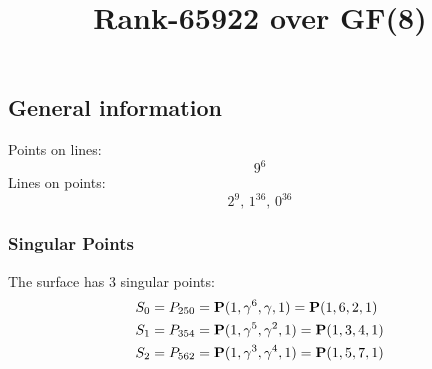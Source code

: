 \documentclass{article}
\newcommand\setTBstruts{\def\T{\rule{0pt}{2.6ex}}%
\def\B{\rule[-1.2ex]{0pt}{0pt}}}
\newcommand{\bP}{{\bf P}}
\begin{document}
 
\setTBstruts



{\allowdisplaybreaks%






\title{Rank-65922 over GF(8)}
\author{}%
\maketitle%
%
{}



\subsection*{General information}
Points on lines:
$$
9^6$$
Lines on points:
$$
2^9,\,1^{36},\,0^{36}$$
\subsubsection*{Singular Points}
The surface has 3 singular points:\\
\begin{align*}
S_{0} &= P_{250}=\bP(1, \gamma^{6}, \gamma , 1) = \bP(1, 6, 2, 1)\\
S_{1} &= P_{354}=\bP(1, \gamma^{5}, \gamma^{2}, 1) = \bP(1, 3, 4, 1)\\
S_{2} &= P_{562}=\bP(1, \gamma^{3}, \gamma^{4}, 1) = \bP(1, 5, 7, 1)\\
\end{align*}
}
\end{document}
